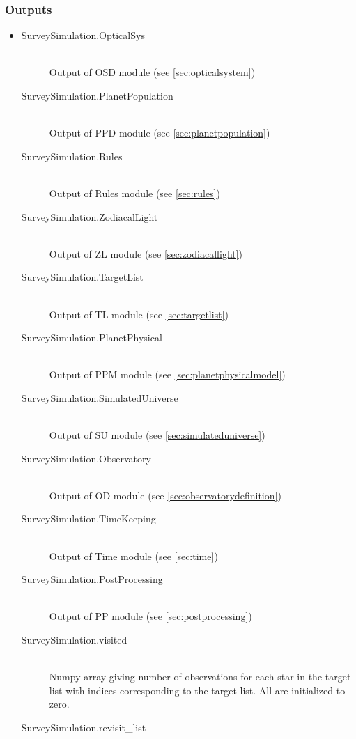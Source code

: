 \documentclass[cleanfoot]{asme2ej}
\begin{document}
\subsubsection*{Outputs}
\begin{itemize}
    \item
    \begin{description}
        \item[SurveySimulation.OpticalSys] \hfill \\
        Output of OSD module (see \ref{sec:opticalsystem})
        \item[SurveySimulation.PlanetPopulation] \hfill \\
        Output of PPD module (see \ref{sec:planetpopulation})
        \item[SurveySimulation.Rules] \hfill \\
        Output of Rules module (see \ref{sec:rules})
        \item[SurveySimulation.ZodiacalLight] \hfill \\
        Output of ZL module (see \ref{sec:zodiacallight})
        \item[SurveySimulation.TargetList] \hfill \\
        Output of TL module (see \ref{sec:targetlist})
        \item[SurveySimulation.PlanetPhysical] \hfill \\
        Output of PPM module (see \ref{sec:planetphysicalmodel})
        \item[SurveySimulation.SimulatedUniverse] \hfill \\
        Output of SU module (see \ref{sec:simulateduniverse})
        \item[SurveySimulation.Observatory] \hfill \\
        Output of OD module (see \ref{sec:observatorydefinition})
        \item[SurveySimulation.TimeKeeping] \hfill \\
        Output of Time module (see \ref{sec:time})
        \item[SurveySimulation.PostProcessing] \hfill \\
        Output of PP module (see \ref{sec:postprocessing})
        \item[SurveySimulation.visited] \hfill \\
        Numpy array giving number of observations for each star in the target list with indices corresponding to the target list. All are initialized to zero.
        \item[SurveySimulation.revisit\_list] \hfill \\

\end{description}
\end{itemize}
\end{document}
